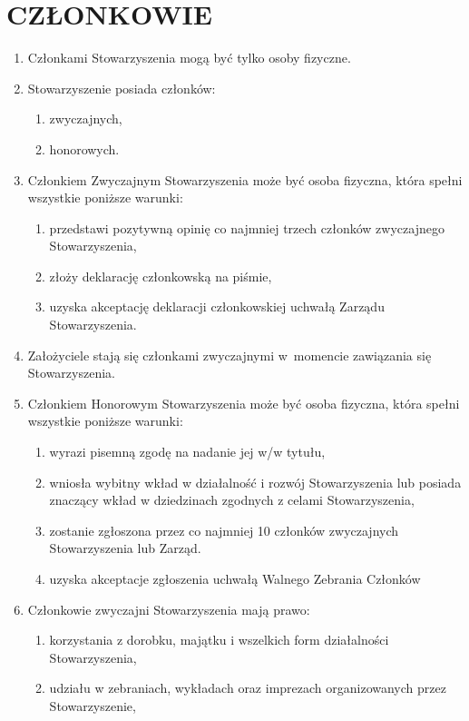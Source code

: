 \documentclass[a4paper,draft,10pt]{article}
\begin{document}
\section{CZŁONKOWIE}
  \begin{enumerate}
    \item Członkami Stowarzyszenia mogą być tylko osoby fizyczne.
    \item Stowarzyszenie posiada członków:
      \begin{enumerate}
        \item zwyczajnych,
        \item honorowych.
      \end{enumerate}
    \item Członkiem Zwyczajnym Stowarzyszenia może być osoba fizyczna, która spełni wszystkie poniższe warunki:
      \begin{enumerate}
         \item przedstawi pozytywną opinię co najmniej trzech członków zwyczajnego Stowarzyszenia,
        \item złoży deklarację członkowską na piśmie,
        \item uzyska akceptację deklaracji członkowskiej uchwałą Zarządu Stowarzyszenia.
      \end{enumerate}
    \item Założyciele stają się członkami zwyczajnymi w~momencie zawiązania się Stowarzyszenia.
    \item Członkiem Honorowym Stowarzyszenia może być osoba fizyczna, która spełni wszystkie poniższe warunki:
      \begin{enumerate}
        \item wyrazi pisemną zgodę na nadanie jej w/w tytułu,
        \item wniosła wybitny wkład w działalność i rozwój Stowarzyszenia lub posiada znaczący wkład w dziedzinach zgodnych z celami Stowarzyszenia,
        \item zostanie zgłoszona przez co najmniej 10 członków zwyczajnych Stowarzyszenia lub Zarząd.
        \item uzyska akceptacje zgłoszenia uchwałą Walnego Zebrania Członków
      \end{enumerate}
    \item Członkowie zwyczajni Stowarzyszenia mają prawo:
      \begin{enumerate}
        \item korzystania z dorobku, majątku i wszelkich form działalności Stowarzyszenia,
        \item udziału w zebraniach, wykładach oraz imprezach organizowanych przez Stowarzyszenie,

\end{enumerate}
\end{enumerate}
\end{document}
